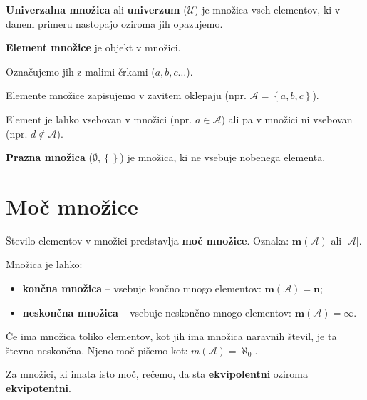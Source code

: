             \textbf{Univerzalna množica} ali \textbf{univerzum} ($\mathcal{U}$) je množica 
            vseh elementov, ki v danem primeru nastopajo oziroma jih opazujemo.
            \newline
    
            \textbf{Element množice} je objekt v množici. 

            Označujemo jih z malimi črkami ($a, b, c \dots$). 

            Elemente množice zapisujemo v zavitem oklepaju (npr. $\mathcal{A}=\left\{a, b, c\right\}$).

            Element je lahko vsebovan v množici (npr. $a\in\mathcal{A}$) ali pa 
            v množici ni vsebovan (npr. $d\notin\mathcal{A}$).
            \newline

            \textbf{Prazna množica} ($\mathbf{\emptyset, \left\{\right\}}$) je množica, 
            ki ne vsebuje nobenega elementa.
        

    

    
        \section{Moč množice}

            Število elementov v množici predstavlja \textbf{moč množice}.
            Oznaka: $\mathbf{m(\mathcal{A})}$ ali $\mathbf{|\mathcal{A}|}$.
        

            Množica je lahko:
            \begin{itemize}
                \item \textbf{končna množica} -- vsebuje končno mnogo elementov: $\mathbf{m(\mathcal{A})=n}$;
                \item \textbf{neskončna množica} -- vsebuje neskončno mnogo elementov: $\mathbf{m(\mathcal{A})=\infty}$.
            \end{itemize}
        

            Če ima množica toliko elementov, kot jih ima množica naravnih števil, je ta števno 
            neskončna.
            Njeno moč pišemo kot: $m(\mathcal{A})=\aleph_0$.
 
            Za množici, ki imata isto moč, rečemo, da sta \textbf{ekvipolentni} oziroma \textbf{ekvipotentni}.
        

    

